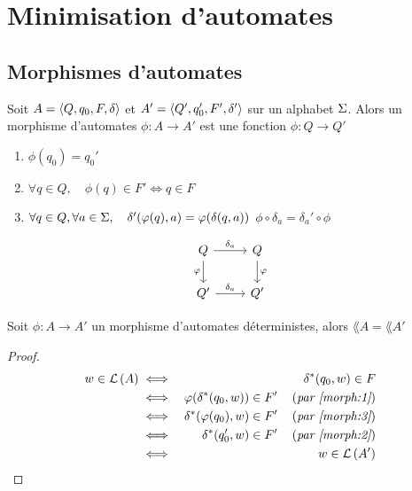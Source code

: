 \section{Minimisation d'automates}

\subsection{Morphismes d'automates}

\begin{definition}
	Soit $A = \langle Q, q_0, F, \delta \rangle$ et $ A' = \langle Q', q_0', F', \delta' \rangle $ sur un alphabet $\Sigma$.
	Alors un morphisme d'automates $\phi: A \to A'$ est une fonction $\phi: Q \to Q'$ \tlq
	\begin{enumerate}
		\item $\phi (q_0) = q_0'$ \label{morph:1}
		\item $\forall q \in Q,\quad  \phi (q) \in F' \iff q \in F$ \label{morph:2}
		\item $\forall q \in Q, \forall a \in \Sigma,\quad \delta'(\varphi (q), a) = \varphi (\delta(q,a))$ \ie $\phi \circ \delta_a = \delta_a '\circ \phi$ \label{morph:3}
	\end{enumerate}

	\[
		\begin{tikzcd}
			Q \arrow{r}{\delta_a} \arrow[swap]{d}{\phi} & Q \arrow{d}{\phi} \\
			Q' \arrow{r}{\delta_a} & Q'
		\end{tikzcd}
	\]

\end{definition}


\begin{exercice}
	Soit $\phi : A \to A'$ un morphisme d'automates déterministes, alors $\lang A = \lang {A'}$
\end{exercice}

\begin{proof}
	\begin{eqnarray*}
		w \in \mathcal{L}\left(A\right) &\iff& \delta^{*} (q_0, w) \in F \\
		&\iff& \varphi (\delta^{*} (q_0, w)) \in F' \quad\left(\textit{par \ref{morph:1}}\right)\\
		&\iff& \delta^{*}( \varphi (q_0), w) \in F' \quad\left(\textit{par \ref{morph:3}}\right)\\
		&\iff& \delta^{*}( q_0', w) \in F' \quad\left(\textit{par \ref{morph:2}}\right)\\
		&\iff& w \in \mathcal{L}\left(A'\right)
	\end{eqnarray*}
\end{proof}


